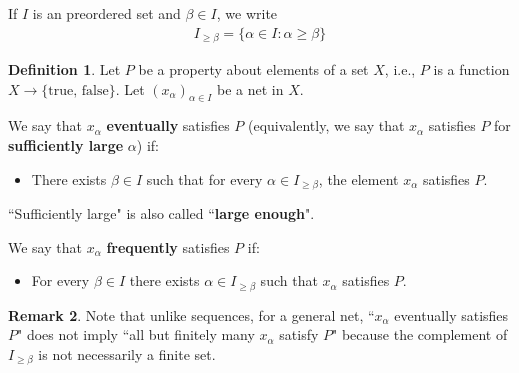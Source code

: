 \documentclass[12pt,b5paper,notitlepage]{article}
\theoremstyle{definition}
\newtheorem{df}{Definition}[section]
\newtheorem{rem}[df]{Remark}
\theoremstyle{plain}
\numberwithin{equation}{section}
\begin{document}
If $I$ is an preordered set and $\beta\in I$, we write 
\begin{gather}
I_{\geq\beta}=\{\alpha\in I:\alpha\geq\beta\}
\end{gather}
\begin{df}
Let $P$ be a property about elements of a set $X$, i.e., $P$ is a function $X\rightarrow\{\text{true, false}\}$. Let $(x_\alpha)_{\alpha\in I}$ be a net in $X$. 

We say that $x_\alpha$ \textbf{eventually}  satisfies $P$ (equivalently, we say that $x_\alpha$ satisfies $P$ for \textbf{sufficiently large}  $\alpha$) if:
\begin{itemize}
\item There exists $\beta\in I$ such that for every $\alpha\in I_{\geq\beta}$, the element $x_\alpha$ satisfies $P$.
\end{itemize}
``Sufficiently large" is also called ``\textbf{large enough}". 

We say that $x_\alpha$ \textbf{frequently}  satisfies $P$ if:
\begin{itemize}
\item For every $\beta\in I$ there exists $\alpha\in I_{\geq\beta}$ such that $x_\alpha$ satisfies $P$.
\end{itemize}
\hfill\qedsymbol
\end{df}


\begin{rem}
Note that unlike sequences, for a general net, ``$x_\alpha$ eventually satisfies $P$" does not imply ``all but finitely many $x_\alpha$ satisfy $P$" because the complement of $I_{\geq\beta}$ is not necessarily a finite set.  
\end{rem}
\end{document}
